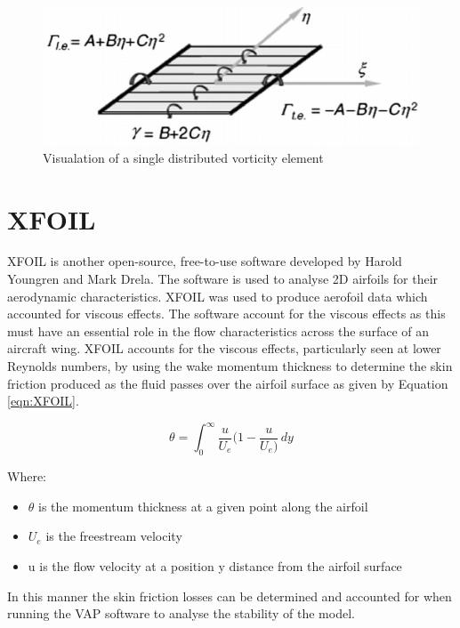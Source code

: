 \begin{figure}
\includegraphics[width=\linewidth]{04_Methodology/Figs/vortex.png}
\caption{Visualation of a single distributed vorticity element}
\label{fig:Votices}
\end{figure}



\section{XFOIL}
XFOIL is another open-source, free-to-use software developed by Harold Youngren and Mark Drela. The software is used to analyse 2D airfoils for their aerodynamic characteristics. XFOIL was used to produce aerofoil data which accounted for viscous effects. The software account for the viscous effects as this must have an essential role in the flow characteristics across the surface of an aircraft wing. XFOIL accounts for the viscous effects, particularly seen at lower Reynolds numbers, by using the wake momentum thickness to determine the skin friction produced as the fluid passes over the airfoil surface as given by Equation \ref{eqn:XFOIL}. 


\begin{equation}
    \theta = \int_{0}^{\infty} \frac{u}{U_e} ( 1 - \frac{u}{U_e) } \,dy
    \label{eqn:XFOIL}
\end{equation}

Where:
\begin{itemize}
    \item $\theta$ is the momentum thickness at a given point along the airfoil
    \item $U_e$ is the freestream velocity 
    \item u is the flow velocity at a position y distance from the airfoil surface
\end{itemize}

In this manner the skin friction losses can be determined and accounted for when running the VAP software to analyse the stability of the model. 

